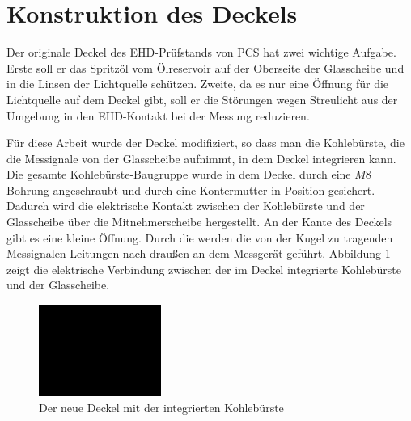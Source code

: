 \section{Konstruktion des Deckels}
\label{sec:konstruktion_des_deckels}

Der originale Deckel des EHD-Prüfstands von PCS hat zwei wichtige Aufgabe.
Erste soll er das Spritzöl vom Ölreservoir auf der Oberseite der Glasscheibe und in die Linsen der Lichtquelle schützen.
Zweite, da es nur eine Öffnung für die Lichtquelle auf dem Deckel gibt, soll er die Störungen wegen Streulicht aus der Umgebung in den EHD-Kontakt bei der Messung reduzieren.

Für diese Arbeit wurde der Deckel modifiziert, so dass man die Kohlebürste, die die Messignale von der Glasscheibe aufnimmt, in dem Deckel integrieren kann.
Die gesamte Kohlebürste-Baugruppe wurde in dem Deckel durch eine $M8$ Bohrung angeschraubt und durch eine Kontermutter in Position gesichert.
Dadurch wird die elektrische Kontakt zwischen der Kohlebürste und der Glasscheibe über die Mitnehmerscheibe hergestellt.
An der Kante des Deckels gibt es eine kleine Öffnung.
Durch die werden die von der Kugel zu tragenden Messignalen Leitungen nach draußen an dem Messgerät geführt.
Abbildung \ref{fig:deckel_mit_kohlebuersten} zeigt die elektrische Verbindung zwischen der im Deckel integrierte Kohlebürste und der Glasscheibe.
\begin{figure}[htb]
    \centering
    \includegraphics[width=4cm]{./images/blank_img.jpg}
    \caption{Der neue Deckel mit der integrierten Kohlebürste}
    \label{fig:deckel_mit_kohlebuersten}
\end{figure}
%
